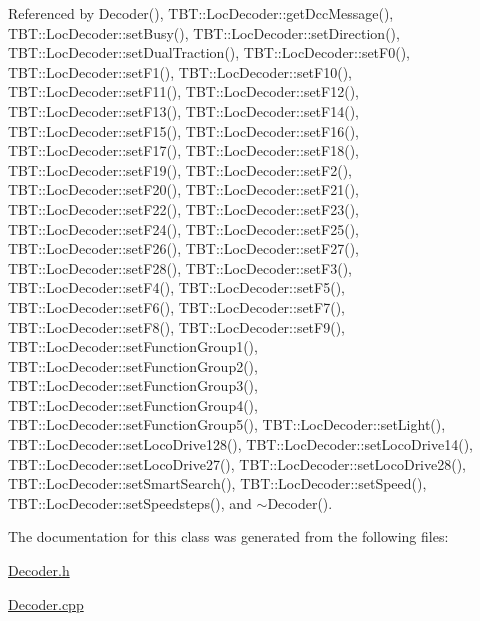 Referenced by Decoder(), T\+B\+T\+::\+Loc\+Decoder\+::get\+Dcc\+Message(), T\+B\+T\+::\+Loc\+Decoder\+::set\+Busy(), T\+B\+T\+::\+Loc\+Decoder\+::set\+Direction(), T\+B\+T\+::\+Loc\+Decoder\+::set\+Dual\+Traction(), T\+B\+T\+::\+Loc\+Decoder\+::set\+F0(), T\+B\+T\+::\+Loc\+Decoder\+::set\+F1(), T\+B\+T\+::\+Loc\+Decoder\+::set\+F10(), T\+B\+T\+::\+Loc\+Decoder\+::set\+F11(), T\+B\+T\+::\+Loc\+Decoder\+::set\+F12(), T\+B\+T\+::\+Loc\+Decoder\+::set\+F13(), T\+B\+T\+::\+Loc\+Decoder\+::set\+F14(), T\+B\+T\+::\+Loc\+Decoder\+::set\+F15(), T\+B\+T\+::\+Loc\+Decoder\+::set\+F16(), T\+B\+T\+::\+Loc\+Decoder\+::set\+F17(), T\+B\+T\+::\+Loc\+Decoder\+::set\+F18(), T\+B\+T\+::\+Loc\+Decoder\+::set\+F19(), T\+B\+T\+::\+Loc\+Decoder\+::set\+F2(), T\+B\+T\+::\+Loc\+Decoder\+::set\+F20(), T\+B\+T\+::\+Loc\+Decoder\+::set\+F21(), T\+B\+T\+::\+Loc\+Decoder\+::set\+F22(), T\+B\+T\+::\+Loc\+Decoder\+::set\+F23(), T\+B\+T\+::\+Loc\+Decoder\+::set\+F24(), T\+B\+T\+::\+Loc\+Decoder\+::set\+F25(), T\+B\+T\+::\+Loc\+Decoder\+::set\+F26(), T\+B\+T\+::\+Loc\+Decoder\+::set\+F27(), T\+B\+T\+::\+Loc\+Decoder\+::set\+F28(), T\+B\+T\+::\+Loc\+Decoder\+::set\+F3(), T\+B\+T\+::\+Loc\+Decoder\+::set\+F4(), T\+B\+T\+::\+Loc\+Decoder\+::set\+F5(), T\+B\+T\+::\+Loc\+Decoder\+::set\+F6(), T\+B\+T\+::\+Loc\+Decoder\+::set\+F7(), T\+B\+T\+::\+Loc\+Decoder\+::set\+F8(), T\+B\+T\+::\+Loc\+Decoder\+::set\+F9(), T\+B\+T\+::\+Loc\+Decoder\+::set\+Function\+Group1(), T\+B\+T\+::\+Loc\+Decoder\+::set\+Function\+Group2(), T\+B\+T\+::\+Loc\+Decoder\+::set\+Function\+Group3(), T\+B\+T\+::\+Loc\+Decoder\+::set\+Function\+Group4(), T\+B\+T\+::\+Loc\+Decoder\+::set\+Function\+Group5(), T\+B\+T\+::\+Loc\+Decoder\+::set\+Light(), T\+B\+T\+::\+Loc\+Decoder\+::set\+Loco\+Drive128(), T\+B\+T\+::\+Loc\+Decoder\+::set\+Loco\+Drive14(), T\+B\+T\+::\+Loc\+Decoder\+::set\+Loco\+Drive27(), T\+B\+T\+::\+Loc\+Decoder\+::set\+Loco\+Drive28(), T\+B\+T\+::\+Loc\+Decoder\+::set\+Smart\+Search(), T\+B\+T\+::\+Loc\+Decoder\+::set\+Speed(), T\+B\+T\+::\+Loc\+Decoder\+::set\+Speedsteps(), and $\sim$\+Decoder().



The documentation for this class was generated from the following files\+:\begin{DoxyCompactItemize}
\item 
\hyperlink{Decoder_8h}{Decoder.\+h}\item 
\hyperlink{Decoder_8cpp}{Decoder.\+cpp}\end{DoxyCompactItemize}

